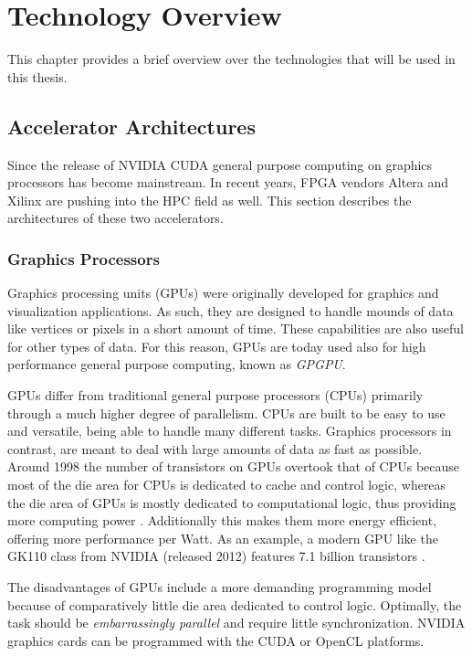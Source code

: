 \chapter{Technology Overview}
\label{section:theory}

This chapter provides a brief overview over the technologies that will be used in this thesis.


\section{Accelerator Architectures}


Since the release of NVIDIA CUDA general purpose computing on graphics processors has become mainstream.
In recent years, FPGA vendors Altera and Xilinx are pushing into the HPC field as well.
This section describes the architectures of these two accelerators.



\subsection{Graphics Processors}

Graphics processing units (GPUs) were originally developed for graphics and visualization applications.
As such, they are designed to handle mounds of data like vertices or pixels in a short amount of time.
These capabilities are also useful for other types of data.
For this reason, GPUs are today used also for high performance general purpose computing, known as \emph{GPGPU}.



GPUs differ from traditional general purpose processors (CPUs) primarily through a much higher degree of parallelism.
CPUs are built to be easy to use and versatile, being able to handle many different tasks. Graphics processors in contrast, are meant to deal with large amounts of data as fast as possible. Around 1998 the number of transistors on GPUs overtook that of CPUs because most of the die area for CPUs is dedicated to cache and control logic, whereas the die area of GPUs is mostly dedicated to computational logic, thus providing more computing power \cite{wilt}.
Additionally this makes them more energy efficient, offering more performance per Watt.
As an example, a modern GPU like the GK110 class from NVIDIA (released 2012) features 7.1 billion transistors \cite{gk110}.



The disadvantages of GPUs include a more demanding programming model because of comparatively little die area dedicated to control logic.
Optimally, the task should be \emph{embarrassingly parallel} and require little synchronization.
NVIDIA graphics cards can be programmed with the CUDA \cite{cudaguide} or OpenCL \cite{opencl} platforms.

